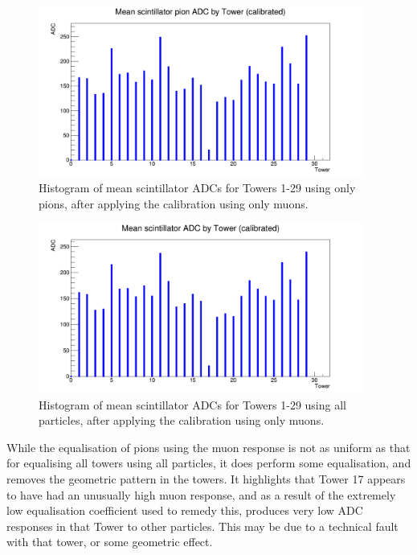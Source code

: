 \begin{figure}[h]
	\centering
	\includegraphics[width=0.95\textwidth]{../Pictures/IDEA/Calibration/towerplot-scintillator-mean-muoncalibrated-pions.png}
	\caption{Histogram of mean scintillator \acrshort{ADC}s for Towers 1-29 using only pions, after applying the calibration using only muons.}
	\label{figure:testbeam/results/towerplot-mean-muoncalibrated-pions}
\end{figure}

\begin{figure}[h]
	\centering
	\includegraphics[width=0.95\textwidth]{../Pictures/IDEA/Calibration/towerplot-scintillator-mean-muoncalibrated-all.png}
	\caption{Histogram of mean scintillator \acrshort{ADC}s for Towers 1-29 using all particles, after applying the calibration using only muons.}
	\label{figure:testbeam/results/towerplot-mean-muoncalibrated-all}
\end{figure}

While the equalisation of pions using the muon response is not as uniform as that for equalising all towers using all particles, it does perform some equalisation, and removes the geometric pattern in the towers. It highlights that Tower 17 appears to have had an unusually high muon response, and as a result of the extremely low equalisation coefficient used to remedy this, produces very low ADC responses in that Tower to other particles. This may be due to a technical fault with that tower, or some geometric effect.

